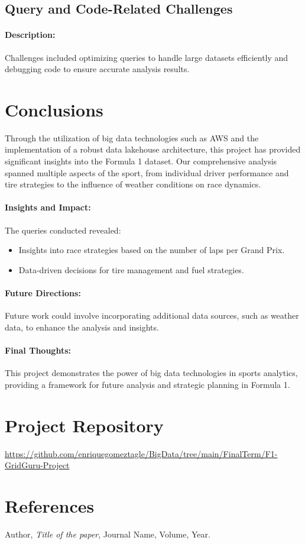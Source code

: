 \documentclass{article}
\begin{document}
\subsection{Query and Code-Related Challenges}
\paragraph{Description:}
Challenges included optimizing queries to handle large datasets efficiently and debugging code to ensure accurate analysis results.

\section{Conclusions}
Through the utilization of big data technologies such as AWS and the implementation of a robust data lakehouse architecture, this project has provided significant insights into the Formula 1 dataset. Our comprehensive analysis spanned multiple aspects of the sport, from individual driver performance and tire strategies to the influence of weather conditions on race dynamics.

\paragraph{Insights and Impact:}
The queries conducted revealed:
\begin{itemize}
    \item Insights into race strategies based on the number of laps per Grand Prix.
    \item Data-driven decisions for tire management and fuel strategies.
\end{itemize}

\paragraph{Future Directions:}
Future work could involve incorporating additional data sources, such as weather data, to enhance the analysis and insights.

\paragraph{Final Thoughts:}
This project demonstrates the power of big data technologies in sports analytics, providing a framework for future analysis and strategic planning in Formula 1.

\section{Project Repository}
\url{https://github.com/enriquegomeztagle/BigData/tree/main/FinalTerm/F1-GridGuru-Project}

\section{References}
\label{sec:references}
\begin{thebibliography}{9}
Author, \textit{Title of the paper}, Journal Name, Volume, Year.
\end{thebibliography}
\end{document}
